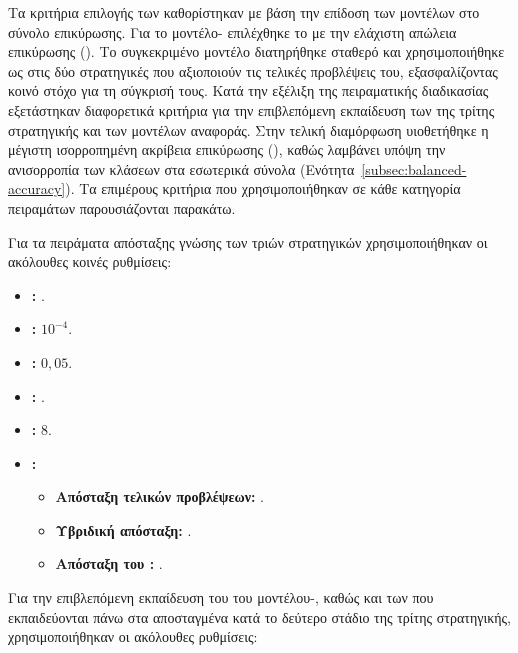 Τα κριτήρια επιλογής των  καθορίστηκαν με βάση την
επίδοση των μοντέλων στο σύνολο επικύρωσης. Για το μοντέλο-
επιλέχθηκε το  με την ελάχιστη απώλεια επικύρωσης
(). Το συγκεκριμένο μοντέλο διατηρήθηκε σταθερό
και χρησιμοποιήθηκε ως  στις δύο στρατηγικές που
αξιοποιούν τις τελικές προβλέψεις του, εξασφαλίζοντας κοινό στόχο για τη
σύγκρισή τους. Κατά την εξέλιξη της πειραματικής διαδικασίας εξετάστηκαν
διαφορετικά κριτήρια για την επιβλεπόμενη εκπαίδευση των
 της τρίτης στρατηγικής και των μοντέλων
αναφοράς. Στην τελική διαμόρφωση υιοθετήθηκε η μέγιστη ισορροπημένη
ακρίβεια επικύρωσης (), καθώς
λαμβάνει υπόψη την ανισορροπία των κλάσεων στα εσωτερικά σύνολα
(Ενότητα~\ref{subsec:balanced-accuracy}). Τα επιμέρους κριτήρια που
χρησιμοποιήθηκαν σε κάθε κατηγορία πειραμάτων παρουσιάζονται παρακάτω.

Για τα πειράματα απόσταξης γνώσης των τριών στρατηγικών χρησιμοποιήθηκαν οι
ακόλουθες κοινές ρυθμίσεις:

\begin{itemize}
    \item \textbf{:} .
    \item \textbf{:} \(10^{-4}\).
    \item \textbf{:} \(0{,}05\).
    \item \textbf{:}
    .
    \item \textbf{:} \(8\).
    \item \textbf{:}
    \begin{itemize}
        \item \textbf{Απόσταξη τελικών προβλέψεων:}
        .
        \item \textbf{Υβριδική απόσταξη:}
        .
        \item \textbf{Απόσταξη του :}
        .
    \end{itemize}
\end{itemize}
\vspace{0.5\baselineskip}
Για την επιβλεπόμενη εκπαίδευση του  του
μοντέλου-, καθώς και των  που
εκπαιδεύονται πάνω στα αποσταγμένα  κατά το δεύτερο στάδιο
της τρίτης στρατηγικής, χρησιμοποιήθηκαν οι ακόλουθες ρυθμίσεις:

